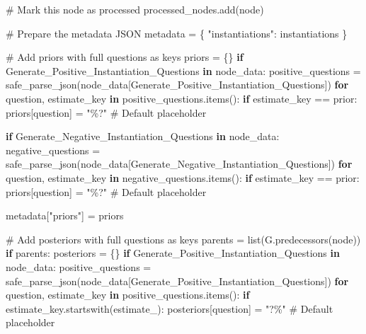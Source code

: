 \documentclass[
  11pt,
  letterpaper,
]{book}
\newenvironment{Shaded}{\begin{snugshade}}{\end{snugshade}}
\newcommand{\BuiltInTok}[1]{\textcolor[rgb]{0.00,0.23,0.31}{#1}}
\newcommand{\CommentTok}[1]{\textcolor[rgb]{0.37,0.37,0.37}{#1}}
\newcommand{\ControlFlowTok}[1]{\textcolor[rgb]{0.00,0.23,0.31}{\textbf{#1}}}
\newcommand{\KeywordTok}[1]{\textcolor[rgb]{0.00,0.23,0.31}{\textbf{#1}}}
\newcommand{\NormalTok}[1]{\textcolor[rgb]{0.00,0.23,0.31}{#1}}
\newcommand{\OperatorTok}[1]{\textcolor[rgb]{0.37,0.37,0.37}{#1}}
\newcommand{\StringTok}[1]{\textcolor[rgb]{0.13,0.47,0.30}{#1}}
\begin{document}
\begin{Shaded}
\begin{Highlighting}[]
      \CommentTok{\# Mark this node as processed}
\NormalTok{      processed\_nodes.add(node)}

      \CommentTok{\# Prepare the metadata JSON}
\NormalTok{      metadata }\OperatorTok{=}\NormalTok{ \{}
          \StringTok{"instantiations"}\NormalTok{: instantiations}
\NormalTok{      \}}

      \CommentTok{\# Add priors with full questions as keys}
\NormalTok{      priors }\OperatorTok{=}\NormalTok{ \{\}}
      \ControlFlowTok{if} \StringTok{\textquotesingle{}Generate\_Positive\_Instantiation\_Questions\textquotesingle{}} \KeywordTok{in}\NormalTok{ node\_data:}
\NormalTok{          positive\_questions }\OperatorTok{=}\NormalTok{ safe\_parse\_json(node\_data[}\StringTok{\textquotesingle{}Generate\_Positive\_Instantiation\_Questions\textquotesingle{}}\NormalTok{])}
          \ControlFlowTok{for}\NormalTok{ question, estimate\_key }\KeywordTok{in}\NormalTok{ positive\_questions.items():}
              \ControlFlowTok{if}\NormalTok{ estimate\_key }\OperatorTok{==} \StringTok{\textquotesingle{}prior\textquotesingle{}}\NormalTok{:}
\NormalTok{                  priors[question] }\OperatorTok{=} \StringTok{"\%?"}  \CommentTok{\# Default placeholder}

      \ControlFlowTok{if} \StringTok{\textquotesingle{}Generate\_Negative\_Instantiation\_Questions\textquotesingle{}} \KeywordTok{in}\NormalTok{ node\_data:}
\NormalTok{          negative\_questions }\OperatorTok{=}\NormalTok{ safe\_parse\_json(node\_data[}\StringTok{\textquotesingle{}Generate\_Negative\_Instantiation\_Questions\textquotesingle{}}\NormalTok{])}
          \ControlFlowTok{for}\NormalTok{ question, estimate\_key }\KeywordTok{in}\NormalTok{ negative\_questions.items():}
              \ControlFlowTok{if}\NormalTok{ estimate\_key }\OperatorTok{==} \StringTok{\textquotesingle{}prior\textquotesingle{}}\NormalTok{:}
\NormalTok{                  priors[question] }\OperatorTok{=} \StringTok{"\%?"}  \CommentTok{\# Default placeholder}

\NormalTok{      metadata[}\StringTok{"priors"}\NormalTok{] }\OperatorTok{=}\NormalTok{ priors}

      \CommentTok{\# Add posteriors with full questions as keys}
\NormalTok{      parents }\OperatorTok{=} \BuiltInTok{list}\NormalTok{(G.predecessors(node))}
      \ControlFlowTok{if}\NormalTok{ parents:}
\NormalTok{          posteriors }\OperatorTok{=}\NormalTok{ \{\}}
          \ControlFlowTok{if} \StringTok{\textquotesingle{}Generate\_Positive\_Instantiation\_Questions\textquotesingle{}} \KeywordTok{in}\NormalTok{ node\_data:}
\NormalTok{              positive\_questions }\OperatorTok{=}\NormalTok{ safe\_parse\_json(node\_data[}\StringTok{\textquotesingle{}Generate\_Positive\_Instantiation\_Questions\textquotesingle{}}\NormalTok{])}
              \ControlFlowTok{for}\NormalTok{ question, estimate\_key }\KeywordTok{in}\NormalTok{ positive\_questions.items():}
                  \ControlFlowTok{if}\NormalTok{ estimate\_key.startswith(}\StringTok{\textquotesingle{}estimate\_\textquotesingle{}}\NormalTok{):}
\NormalTok{                      posteriors[question] }\OperatorTok{=} \StringTok{"?\%"}  \CommentTok{\# Default placeholder}


\end{Highlighting}
\end{Shaded}
\end{document}
